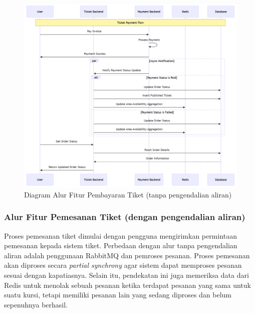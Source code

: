 \begin{figure}[h]
    \centering
    \includegraphics[width=1\textwidth]{resources/chapter-3/order-payment.png}
    \caption{Diagram Alur Fitur Pembayaran Tiket (tanpa pengendalian aliran)}
    \label{fig:flow-order-payment-flow}
\end{figure}

\pagebreak

\subsubsection{Alur Fitur Pemesanan Tiket (dengan pengendalian aliran)}

Proses pemesanan tiket dimulai dengan pengguna mengirimkan permintaan pemesanan kepada sistem tiket. Perbedaan dengan alur tanpa pengendalian aliran adalah penggunaan RabbitMQ dan pemroses pesanan. Proses pemesanan akan diproses secara \textit{partial synchrony} agar sistem dapat memproses pesanan sesuai dengan kapatiasnya. Selain itu, pendekatan ini juga memeriksa data dari Redis untuk menolak sebuah pesanan ketika terdapat pesanan yang sama untuk suatu kursi, tetapi memiliki pesanan lain yang sedang diproses dan belum sepenuhnya berhasil.

